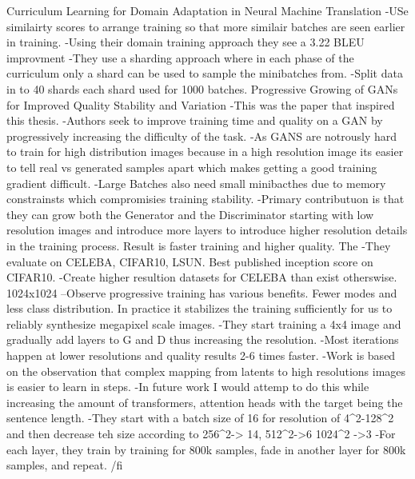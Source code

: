 Curriculum Learning for Domain Adaptation in Neural Machine Translation
-USe similairty scores to arrange training so that more similair batches are seen earlier in training. 
-Using their domain training approach they see a 3.22 BLEU improvment
-They use a sharding approach where in each phase of the curriculum only a shard can be used to sample the minibatches from. 
-Split data in to 40 shards each shard used for 1000 batches.
Progressive Growing of GANs for Improved Quality Stability and Variation
-This was the paper that inspired this thesis. 
-Authors seek to improve training time and quality on a GAN by progressively increasing the difficulty of the task. 
-As GANS are notrously hard to train for high distribution images because in a high resolution image its easier to tell real vs generated samples apart which makes getting a good training gradient difficult.
-Large Batches also need small minibacthes due to memory constrainsts which compromisies training stability. 
-Primary contributuon is that they can grow both the Generator and the Discriminator starting with low resolution images and introduce more layers to introduce higher resolution details in the training process. Result is faster training and higher quality. The
-They evaluate on CELEBA, CIFAR10, LSUN. Best published inception score on CIFAR10.
-Create higher resultion datasets for CELEBA than exist otherswise. 1024x1024
--Observe progressive training has various benefits. Fewer modes and less class distribution. In practice it stabilizes the training sufficiently for us to reliably synthesize megapixel scale images.
-They start training a 4x4 image and gradually add layers to G and D thus increasing the resolution.
-Most iterations happen at lower resolutions and quality results 2-6 times faster. 
-Work is based on the observation that complex mapping from latents to high resolutions images is easier to learn in steps. 
-In future work I would attemp to do this while increasing the amount of transformers, attention heads with the target being the sentence length.
-They start with a batch size of 16 for resolution of 4^2-128^2 and then decrease teh size according to 256^2-> 14, 512^2->6 1024^2 ->3
-For each layer, they train by training for 800k samples, fade in another layer for 800k samples, and repeat. 
/fi